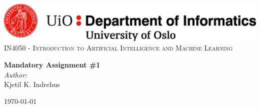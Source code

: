 \begin{titlepage}
    \vbox{ }
    \vbox{ }
    \begin{center}
        \includegraphics[width=1\textwidth]{./images/ifi.png}\\[1cm]
        \textsc{\Large IN4050 - Introduction to Artificial Intelligence and Machine Learning}\\[0.5cm]
        \vbox{ }
        
        { \huge \bfseries Mandatory Assignment \#1}\\[0.4cm]
        
        \large
        \emph{Author:}\\
            Kjetil K. Indrehus
        \vfill
        
        {\large\today}
    \end{center}
\end{titlepage}